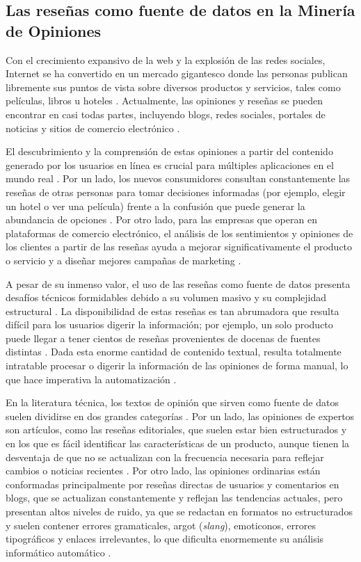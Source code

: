 \subsection{Las reseñas como fuente de datos en la Minería de Opiniones}\label{subsec:resenas_fuente_datos}

Con el crecimiento expansivo de la web y la explosión de las redes sociales, Internet se ha convertido en un mercado gigantesco donde las personas publican libremente sus puntos de vista sobre diversos productos y servicios, tales como películas, libros u hoteles \parencite{AliEtAl2016}. Actualmente, las opiniones y reseñas se pueden encontrar en casi todas partes, incluyendo blogs, redes sociales, portales de noticias y sitios de comercio electrónico \parencite{KimEtAl2010}.

El descubrimiento y la comprensión de estas opiniones a partir del contenido generado por los usuarios en línea es crucial para múltiples aplicaciones en el mundo real \parencite{ZhangEtAl2022}. Por un lado, los nuevos consumidores consultan constantemente las reseñas de otras personas para tomar decisiones informadas (por ejemplo, elegir un hotel o ver una película) frente a la confusión que puede generar la abundancia de opciones \parencite{AliEtAl2016}. Por otro lado, para las empresas que operan en plataformas de comercio electrónico, el análisis de los sentimientos y opiniones de los clientes a partir de las reseñas ayuda a mejorar significativamente el producto o servicio y a diseñar mejores campañas de marketing \parencite{ZhangEtAl2022}.

A pesar de su inmenso valor, el uso de las reseñas como fuente de datos presenta desafíos técnicos formidables debido a su volumen masivo y su complejidad estructural \parencite{KimEtAl2010}. La disponibilidad de estas reseñas es tan abrumadora que resulta difícil para los usuarios digerir la información; por ejemplo, un solo producto puede llegar a tener cientos de reseñas provenientes de docenas de fuentes distintas \parencite{KimEtAl2010}. Dada esta enorme cantidad de contenido textual, resulta totalmente intratable procesar o digerir la información de las opiniones de forma manual, lo que hace imperativa la automatización \parencite{ZhangEtAl2022}.

En la literatura técnica, los textos de opinión que sirven como fuente de datos suelen dividirse en dos grandes categorías \parencite{KimEtAl2010}. Por un lado, las opiniones de expertos son artículos, como las reseñas editoriales, que suelen estar bien estructurados y en los que es fácil identificar las características de un producto, aunque tienen la desventaja de que no se actualizan con la frecuencia necesaria para reflejar cambios o noticias recientes \parencite{KimEtAl2010}. Por otro lado, las opiniones ordinarias están conformadas principalmente por reseñas directas de usuarios y comentarios en blogs, que se actualizan constantemente y reflejan las tendencias actuales, pero presentan altos niveles de ruido, ya que se redactan en formatos no estructurados y suelen contener errores gramaticales, argot (\emph{slang}), emoticonos, errores tipográficos y enlaces irrelevantes, lo que dificulta enormemente su análisis informático automático \parencite{AliEtAl2016, KimEtAl2010}.

